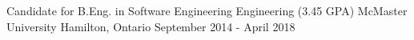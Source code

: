 \begin{cventries}
  \cventry
    {Candidate for B.Eng. in Software Engineering Engineering (3.45 GPA)}
    {McMaster University}
    {Hamilton, Ontario}
    {September 2014 - April 2018}
    {}
\end{cventries}
